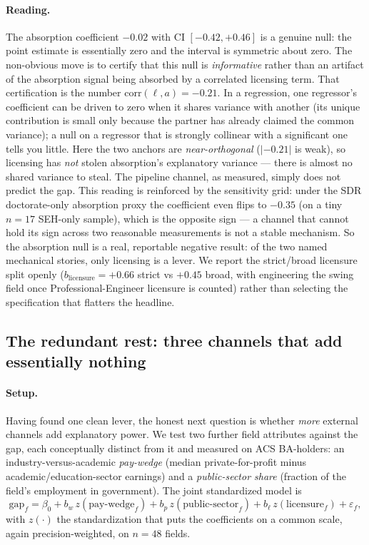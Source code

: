 \documentclass[11pt]{article}
\begin{document}
\paragraph{Reading.} The absorption coefficient $-0.02$ with CI $[-0.42,+0.46]$ is a genuine null: the point estimate is essentially zero and the interval is symmetric about zero. The non-obvious move is to certify that this null is \emph{informative} rather than an artifact of the absorption signal being absorbed by a correlated licensing term. That certification is the number $\mathrm{corr}(\ell,a)=-0.21$. In a regression, one regressor's coefficient can be driven to zero when it shares variance with another (its unique contribution is small only because the partner has already claimed the common variance); a null on a regressor that is strongly collinear with a significant one tells you little. Here the two anchors are \emph{near-orthogonal} ($|{-}0.21|$ is weak), so licensing has \emph{not} stolen absorption's explanatory variance --- there is almost no shared variance to steal. The pipeline channel, as measured, simply does not predict the gap. This reading is reinforced by the sensitivity grid: under the SDR doctorate-only absorption proxy the coefficient even flips to $-0.35$ (on a tiny $n{=}17$ SEH-only sample), which is the opposite sign --- a channel that cannot hold its sign across two reasonable measurements is not a stable mechanism. So the absorption null is a real, reportable negative result: of the two named mechanical stories, only licensing is a lever. We report the strict/broad licensure split openly ($b_{\text{licensure}}=+0.66$ strict vs $+0.45$ broad, with engineering the swing field once Professional-Engineer licensure is counted) rather than selecting the specification that flatters the headline.

\subsection{The redundant rest: three channels that add essentially nothing}

\paragraph{Setup.} Having found one clean lever, the honest next question is whether \emph{more} external channels add explanatory power. We test two further field attributes against the gap, each conceptually distinct from it and measured on ACS BA-holders: an industry-versus-academic \emph{pay-wedge} (median private-for-profit minus academic/education-sector earnings) and a \emph{public-sector share} (fraction of the field's employment in government). The joint standardized model is
\[
\mathrm{gap}_f = \beta_0 + b_w\, z(\text{pay-wedge}_f) + b_p\, z(\text{public-sector}_f) + b_\ell\, z(\text{licensure}_f) + \varepsilon_f,
\]
with $z(\cdot)$ the standardization that puts the coefficients on a common scale, again precision-weighted, on $n{=}48$ fields.
\end{document}
